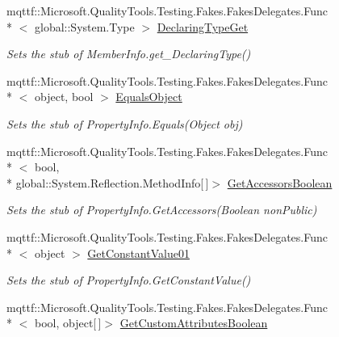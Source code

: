 \begin{DoxyCompactItemize}
mqttf\-::\-Microsoft.\-Quality\-Tools.\-Testing.\-Fakes.\-Fakes\-Delegates.\-Func\\*
$<$ global\-::\-System.\-Type $>$ \hyperlink{class_system_1_1_reflection_1_1_fakes_1_1_stub_property_info_a69ccec60eb0f74eccfdbc44f0a3f3f2e}{Declaring\-Type\-Get}
\begin{DoxyCompactList}\small\item\em Sets the stub of Member\-Info.\-get\-\_\-\-Declaring\-Type()\end{DoxyCompactList}\item 
mqttf\-::\-Microsoft.\-Quality\-Tools.\-Testing.\-Fakes.\-Fakes\-Delegates.\-Func\\*
$<$ object, bool $>$ \hyperlink{class_system_1_1_reflection_1_1_fakes_1_1_stub_property_info_a75d79fd5c2a5d9c098e3939fa93057b0}{Equals\-Object}
\begin{DoxyCompactList}\small\item\em Sets the stub of Property\-Info.\-Equals(\-Object obj)\end{DoxyCompactList}\item 
mqttf\-::\-Microsoft.\-Quality\-Tools.\-Testing.\-Fakes.\-Fakes\-Delegates.\-Func\\*
$<$ bool, \\*
global\-::\-System.\-Reflection.\-Method\-Info\mbox{[}$\,$\mbox{]}$>$ \hyperlink{class_system_1_1_reflection_1_1_fakes_1_1_stub_property_info_a3b688d9cc111a9b53125206a95c7886a}{Get\-Accessors\-Boolean}
\begin{DoxyCompactList}\small\item\em Sets the stub of Property\-Info.\-Get\-Accessors(\-Boolean non\-Public)\end{DoxyCompactList}\item 
mqttf\-::\-Microsoft.\-Quality\-Tools.\-Testing.\-Fakes.\-Fakes\-Delegates.\-Func\\*
$<$ object $>$ \hyperlink{class_system_1_1_reflection_1_1_fakes_1_1_stub_property_info_a34a2725d50457ae19ec4e3b7f92a3bb5}{Get\-Constant\-Value01}
\begin{DoxyCompactList}\small\item\em Sets the stub of Property\-Info.\-Get\-Constant\-Value()\end{DoxyCompactList}\item 
mqttf\-::\-Microsoft.\-Quality\-Tools.\-Testing.\-Fakes.\-Fakes\-Delegates.\-Func\\*
$<$ bool, object\mbox{[}$\,$\mbox{]}$>$ \hyperlink{class_system_1_1_reflection_1_1_fakes_1_1_stub_property_info_a36a643d8823b52ff6de3f6f61108a476}{Get\-Custom\-Attributes\-Boolean}

\end{DoxyCompactItemize}
